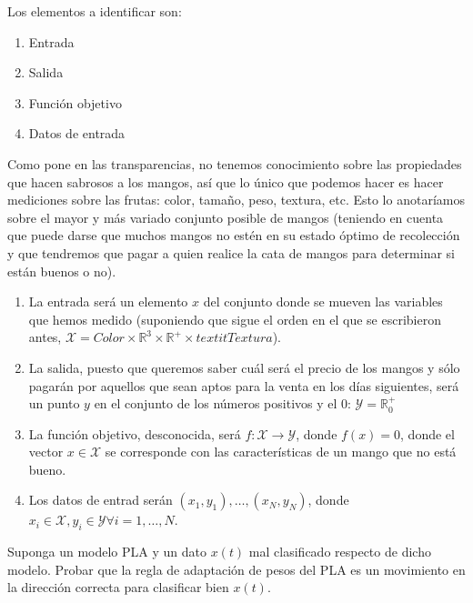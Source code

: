 \documentclass[11pt,leqno]{article}
\theoremstyle{definition}
\begin{document}
\begin{solucion}
Los elementos a identificar son:
\begin{enumerate}[a]
\item Entrada
\item Salida
\item Función objetivo
\item Datos de entrada
\end{enumerate}

Como pone en las transparencias, no tenemos conocimiento sobre las propiedades que hacen sabrosos a los mangos, así que lo único que podemos hacer es hacer mediciones sobre las frutas: color, tamaño, peso, textura, etc. Esto lo anotaríamos sobre el mayor y más variado conjunto posible de mangos (teniendo en cuenta que puede darse que muchos mangos no estén en su estado óptimo de recolección y que tendremos que pagar a quien realice la cata de mangos para determinar si están buenos o no).
\begin{enumerate}[a]
\item La entrada será un elemento $x$ del conjunto donde se mueven las variables que hemos medido (suponiendo que sigue el orden en el que se escribieron antes, $ \mathcal{X} = \textit{Color} \times \mathbb{R}^3 \times \mathbb{R}^+ \times textit{Textura}$).
\item La salida, puesto que queremos saber cuál será el precio de los mangos y sólo pagarán por aquellos que sean aptos para la venta en los días siguientes, será un punto $y$ en el conjunto de los números positivos y el $0$: $\mathcal{Y} = \mathbb{R}^+_0$
\item La función objetivo, desconocida, será $f:\mathcal{X} \longrightarrow \mathcal{Y}$, donde $f(x) = 0$, donde el vector $x \in \mathcal{X}$ se corresponde con las características de un mango que no está bueno.
\item Los datos de entrad serán $(x_1, y_1), \dots, (x_N, y_N)$, donde $x_i \in \mathcal{X}, y_i \in \mathcal{Y} \forall i=1, \dots, N$.

\end{enumerate}
\end{solucion}

\begin{cuestion}
Suponga un modelo PLA y un dato $x(t)$ mal clasificado respecto de dicho modelo. Probar que la regla de adaptación de pesos del PLA es un movimiento en la dirección correcta para clasificar bien $x(t)$.
\end{cuestion}
\end{document}
